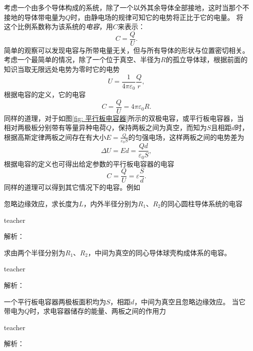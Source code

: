 考虑一个由多个导体构成的系统，除了一个以外其余导体全部接地，这时当那个不接地的导体带电量为$Q$时，由静电场的规律可知它的电势将正比于它的电量。
将这个比例系数称为该系统的\emph{电容}，用$C$来表示：
\begin{equation}
C = \frac{Q}{U}.
\end{equation}\label{eqn: static-elec-孤立导体的电容}
简单的观察可以发现电容与所带电量无关，但与所有导体的形状与位置密切相关。
考虑一个最简单的情况，除了一个位于真空、半径为$R$的孤立导体球，根据前面的知识当取无限远处电势为零时它的电势
\[
U = \frac{1}{4 \pi \varepsilon_0}\frac{Q}{r},
\]
根据电容的定义，它的电容
\begin{equation}
C = \frac{Q}{U} = 4 \pi \varepsilon_0 R.
\end{equation}
同样的道理，对于如图\ref{fig: 平行板电容器}所示的双极电容，或平行板电容器，当相对两极板分别带有等量异种电荷$Q$，保持两板之间为真空，而知为$S$且相距$d$时，根据高斯定律两板之间存在有大小$E = \frac{Q}{ \varepsilon_0 S}$的匀强电场，这样两板之间的电势差为
\[
\Delta U = E d = \frac{Qd}{ \varepsilon_0 S},
\]
根据电容的定义也可得出给定参数的平行板电容器的电容
\begin{equation}
C = \frac{Q}{U} = \varepsilon \frac{S}{d}.
\end{equation}
同样的道理可以得到其它情况下的电容。例如


\begin{example}
忽略边缘效应，求长度为$L$，内外半径分别为$R_1$、$R_2$的同心圆柱导体系统的电容
\begin{taggedblock}{teacher}

解析：
\end{taggedblock}
\end{example}

\begin{example}
求由两个半径分别为$R_1$、$R_2$，中间为真空的同心导体球壳构成体系的电容。
\begin{taggedblock}{teacher}

解析：
\end{taggedblock}
\end{example}

\begin{example}
一个平行板电容器两极板面积均为$S$，相距$d$，中间为真空且忽略边缘效应。
当它带电为$Q$时，求电容器储存的能量、两板之间的作用力
\begin{taggedblock}{teacher}

解析：
\end{taggedblock}
\end{example}

